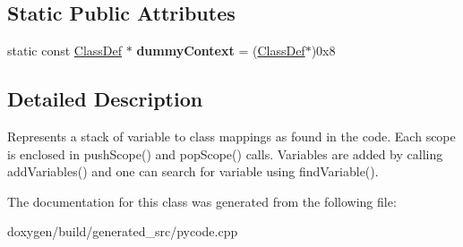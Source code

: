 \subsection*{Static Public Attributes}
\begin{DoxyCompactItemize}
\item 
\mbox{\label{class_py_variable_context_abb3568aff90a5041f86f2219974acc97}} 
static const \mbox{\hyperlink{class_class_def}{Class\+Def}} $\ast$ {\bfseries dummy\+Context} = (\mbox{\hyperlink{class_class_def}{Class\+Def}}$\ast$)0x8
\end{DoxyCompactItemize}


\subsection{Detailed Description}
Represents a stack of variable to class mappings as found in the code. Each scope is enclosed in push\+Scope() and pop\+Scope() calls. Variables are added by calling add\+Variables() and one can search for variable using find\+Variable(). 

The documentation for this class was generated from the following file\+:\begin{DoxyCompactItemize}
\item 
doxygen/build/generated\+\_\+src/pycode.\+cpp\end{DoxyCompactItemize}
